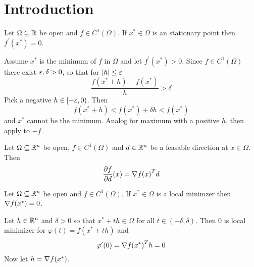 
\newpage
\section{Introduction}

\label{thm:fermat_stationaryl_point}
Let \( \Omega \subseteq \mathbb{R} \) be open and \( f \in C^1(\Omega) \). If \( x^* \in \Omega \) is an stationary point then
\( f^\prime(x^*) = 0 \).

\proof{}
Assume \( x^* \) is the minimum of \( f \) in \( \Omega \) and let \( f^\prime(x^*) > 0 \). 
Since \( f \in C^1(\Omega) \) there exist \( \varepsilon, \delta > 0 \), so that for \( |h| \le \varepsilon \)
\[
    \frac{f(x^* + h) - f(x^*)}{h} > \delta
\]
Pick a negative \( h \in [-\varepsilon, 0) \). Then 
\[
     f(x^* + h) < f(x^*) +  \delta h < f(x^*) 
\]
and \( x^* \) cannot be the minimum. Analog for maximum with a positive \( h \), then apply to \( -f \).
\bigskip


\label{lemma:direction_derivative}
Let \( \Omega \subseteq \mathbb{R}^n \) be open, \( f \in C^1(\Omega) \) and \( d \in \mathbb{R}^n \) be a feasable direction 
at \( x \in \Omega \). Then
\[
    \frac{\partial f}{\partial d}(x) = \nabla{f(x)}^T d
\] 
\bigskip


\label{thm:fonc}
Let \( \Omega \subseteq \mathbb{R}^n \) be open and \( f \in C^1(\Omega) \). If \( x^* \in \Omega \) is a local minimzer then
\( \nabla f(x^*) = 0 \).

\proof{}
Let \( h \in \mathbb{R}^n \) and \( \delta > 0 \) so that \( x^* + th \in \Omega \) for all \( t \in (-\delta, \delta) \). 
Then \( 0 \) is local minimizer for \( \varphi(t) = f(x^* + th) \) and
\[
    \varphi^\prime(0) = {\nabla f(x^*)}^T h = 0
\]
Now let \( h = \nabla f(x^*) \). 
\bigskip
